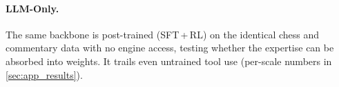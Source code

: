 \paragraph{LLM-Only.} The same backbone is post-trained (SFT\,+\,RL) on the identical chess and commentary data with no engine access, testing whether the expertise can be absorbed into weights. It trails even untrained tool use (per-scale numbers in \cref{sec:app_results}).

